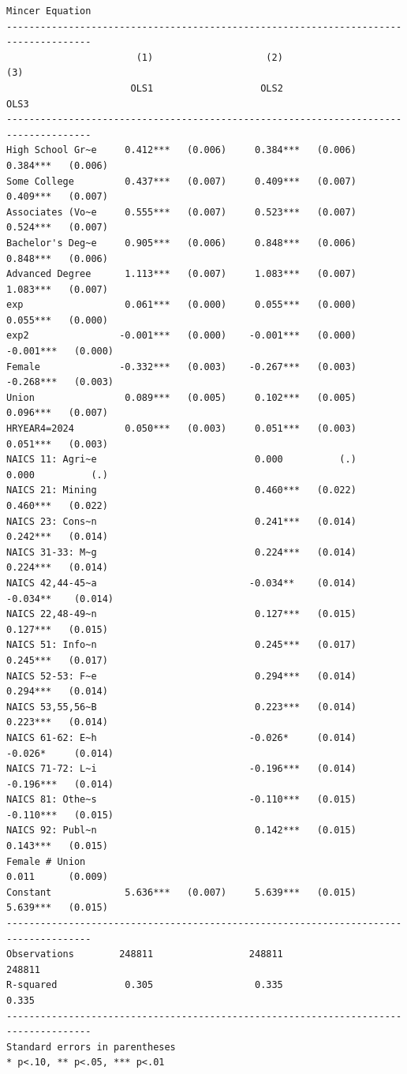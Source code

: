 \documentclass[
]{book}
\begin{document}
\begin{verbatim}
Mincer Equation
-------------------------------------------------------------------------------------
                       (1)                    (2)                    (3)             
                      OLS1                   OLS2                   OLS3             
-------------------------------------------------------------------------------------
High School Gr~e     0.412***   (0.006)     0.384***   (0.006)     0.384***   (0.006)
Some College         0.437***   (0.007)     0.409***   (0.007)     0.409***   (0.007)
Associates (Vo~e     0.555***   (0.007)     0.523***   (0.007)     0.524***   (0.007)
Bachelor's Deg~e     0.905***   (0.006)     0.848***   (0.006)     0.848***   (0.006)
Advanced Degree      1.113***   (0.007)     1.083***   (0.007)     1.083***   (0.007)
exp                  0.061***   (0.000)     0.055***   (0.000)     0.055***   (0.000)
exp2                -0.001***   (0.000)    -0.001***   (0.000)    -0.001***   (0.000)
Female              -0.332***   (0.003)    -0.267***   (0.003)    -0.268***   (0.003)
Union                0.089***   (0.005)     0.102***   (0.005)     0.096***   (0.007)
HRYEAR4=2024         0.050***   (0.003)     0.051***   (0.003)     0.051***   (0.003)
NAICS 11: Agri~e                            0.000          (.)     0.000          (.)
NAICS 21: Mining                            0.460***   (0.022)     0.460***   (0.022)
NAICS 23: Cons~n                            0.241***   (0.014)     0.242***   (0.014)
NAICS 31-33: M~g                            0.224***   (0.014)     0.224***   (0.014)
NAICS 42,44-45~a                           -0.034**    (0.014)    -0.034**    (0.014)
NAICS 22,48-49~n                            0.127***   (0.015)     0.127***   (0.015)
NAICS 51: Info~n                            0.245***   (0.017)     0.245***   (0.017)
NAICS 52-53: F~e                            0.294***   (0.014)     0.294***   (0.014)
NAICS 53,55,56~B                            0.223***   (0.014)     0.223***   (0.014)
NAICS 61-62: E~h                           -0.026*     (0.014)    -0.026*     (0.014)
NAICS 71-72: L~i                           -0.196***   (0.014)    -0.196***   (0.014)
NAICS 81: Othe~s                           -0.110***   (0.015)    -0.110***   (0.015)
NAICS 92: Publ~n                            0.142***   (0.015)     0.143***   (0.015)
Female # Union                                                     0.011      (0.009)
Constant             5.636***   (0.007)     5.639***   (0.015)     5.639***   (0.015)
-------------------------------------------------------------------------------------
Observations        248811                 248811                 248811             
R-squared            0.305                  0.335                  0.335             
-------------------------------------------------------------------------------------
Standard errors in parentheses
* p<.10, ** p<.05, *** p<.01
\end{verbatim}
\end{document}
